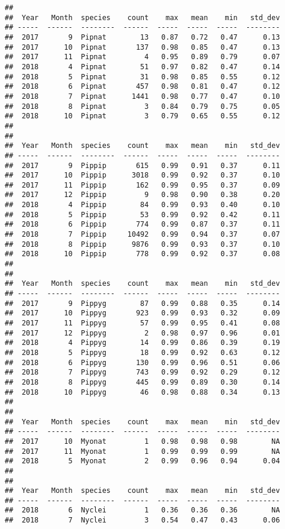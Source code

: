\documentclass[]{article}
\begin{document}
\begin{verbatim}
## 
##  Year   Month  species    count    max   mean    min   std_dev
## -----  ------  --------  ------  -----  -----  -----  --------
##  2017       9  Pipnat        13   0.87   0.72   0.47      0.13
##  2017      10  Pipnat       137   0.98   0.85   0.47      0.13
##  2017      11  Pipnat         4   0.95   0.89   0.79      0.07
##  2018       4  Pipnat        51   0.97   0.82   0.47      0.14
##  2018       5  Pipnat        31   0.98   0.85   0.55      0.12
##  2018       6  Pipnat       457   0.98   0.81   0.47      0.12
##  2018       7  Pipnat      1441   0.98   0.77   0.47      0.10
##  2018       8  Pipnat         3   0.84   0.79   0.75      0.05
##  2018      10  Pipnat         3   0.79   0.65   0.55      0.12
## 
## 
##  Year   Month  species    count    max   mean    min   std_dev
## -----  ------  --------  ------  -----  -----  -----  --------
##  2017       9  Pippip       615   0.99   0.91   0.37      0.11
##  2017      10  Pippip      3018   0.99   0.92   0.37      0.10
##  2017      11  Pippip       162   0.99   0.95   0.37      0.09
##  2017      12  Pippip         9   0.98   0.90   0.38      0.20
##  2018       4  Pippip        84   0.99   0.93   0.40      0.10
##  2018       5  Pippip        53   0.99   0.92   0.42      0.11
##  2018       6  Pippip       774   0.99   0.87   0.37      0.11
##  2018       7  Pippip     10492   0.99   0.94   0.37      0.07
##  2018       8  Pippip      9876   0.99   0.93   0.37      0.10
##  2018      10  Pippip       778   0.99   0.92   0.37      0.08
## 
## 
##  Year   Month  species    count    max   mean    min   std_dev
## -----  ------  --------  ------  -----  -----  -----  --------
##  2017       9  Pippyg        87   0.99   0.88   0.35      0.14
##  2017      10  Pippyg       923   0.99   0.93   0.32      0.09
##  2017      11  Pippyg        57   0.99   0.95   0.41      0.08
##  2017      12  Pippyg         2   0.98   0.97   0.96      0.01
##  2018       4  Pippyg        14   0.99   0.86   0.39      0.19
##  2018       5  Pippyg        18   0.99   0.92   0.63      0.12
##  2018       6  Pippyg       130   0.99   0.96   0.51      0.06
##  2018       7  Pippyg       743   0.99   0.92   0.29      0.12
##  2018       8  Pippyg       445   0.99   0.89   0.30      0.14
##  2018      10  Pippyg        46   0.98   0.88   0.34      0.13
## 
## 
##  Year   Month  species    count    max   mean    min   std_dev
## -----  ------  --------  ------  -----  -----  -----  --------
##  2017      10  Myonat         1   0.98   0.98   0.98        NA
##  2017      11  Myonat         1   0.99   0.99   0.99        NA
##  2018       5  Myonat         2   0.99   0.96   0.94      0.04
## 
## 
##  Year   Month  species    count    max   mean    min   std_dev
## -----  ------  --------  ------  -----  -----  -----  --------
##  2018       6  Nyclei         1   0.36   0.36   0.36        NA
##  2018       7  Nyclei         3   0.54   0.47   0.43      0.06
\end{verbatim}
\end{document}
